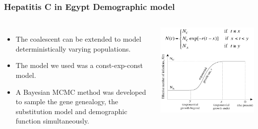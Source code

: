 
\begin{frame}
\frametitle{Hepatitis C in Egypt Demographic model}

\footnotesize{
\begin{columns}[t]


\begin{itemize}
	\item The coalescent can be extended to model deterministically varying populations.
	\item The model we used was a const-exp-const model.
	\item A Bayesian MCMC method was developed to sample the gene genealogy, the substitution model and demographic function simultaneously.
\end{itemize}


\includegraphics[width=\textwidth]{../../images/DemographicModel}

\end{columns}
}

\end{frame}

